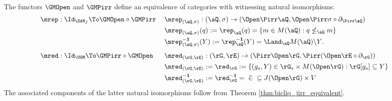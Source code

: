 \documentclass{article}
\begin{document}
\begin{theorem}
\item
The functors $\GMOpen$ and $\GMPirr$ define an equivalence of categories with witnessing natural isomorphisms:
\[
\begin{tabular}{lll}
$\mrep : \Id_{\SAM_f} \To \GMOpen \circ \GMPirr$
&
$\mrep_{(\aQ,\sigma)} : (\aQ,\sigma) \to (\Open\Pirr\aQ,\Open\Pirr\sigma \circ \partial_{\Pirr\aQ})$
\\[1ex]&
$\mrep_{(\aQ,\sigma)}(q) := \rep_\aQ(q) = \{ m \in M(\aQ) : q \nleq_\aQ m \}$
\\[1ex]&
$\mrep_{(\aQ,\sigma)}^{\bf-1}(Y) := \rep_\aQ^{\bf-1}(Y) = \Land_\aQ M(\aQ) \backslash Y$.
\\[2ex]
$\mred : \Id_{\UGM} \To \GMPirr \circ \GMOpen$
&
$\mred_{(\rG,\rE)} : (\rG,\rE) \to (\Pirr\Open\rG,\Pirr(\Open\rE \circ \partial_\rG ))$
\\[1ex]&
$\mred_{(\rG,\rE)} := \red_\rG := \{ (g_s,Y) \in \rG_s \times M(\Open\rG) : \rG[g_s] \subseteq Y \}$
\\[1ex]&
$\mred_{(\rG,\rE)}^{\bf-1} := \red_\rG^{\bf-1} = \; \breve{\in} \; \subseteq J(\Open\rG) \times V$
\end{tabular}
\]
The associated components of the latter natural isomorphisms follow from Theorem \ref{thm:bicliq_jirr_equivalent}.
\end{theorem}
\end{document}
